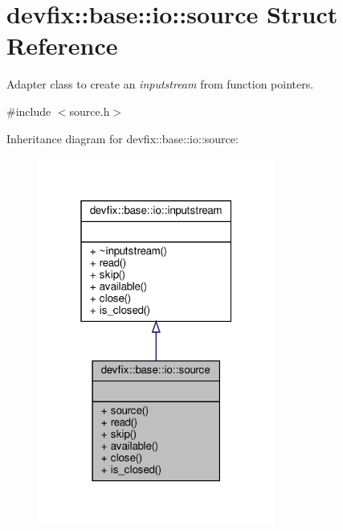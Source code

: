 \hypertarget{structdevfix_1_1base_1_1io_1_1source}{}\section{devfix\+:\+:base\+:\+:io\+:\+:source Struct Reference}
\label{structdevfix_1_1base_1_1io_1_1source}


Adapter class to create an {\itshape inputstream} from function pointers.  




{\ttfamily \#include $<$source.\+h$>$}



Inheritance diagram for devfix\+:\+:base\+:\+:io\+:\+:source\+:\nopagebreak
\begin{figure}[H]
\begin{center}
\leavevmode
\includegraphics[width=220pt]{structdevfix_1_1base_1_1io_1_1source__inherit__graph}
\end{center}
\end{figure}
